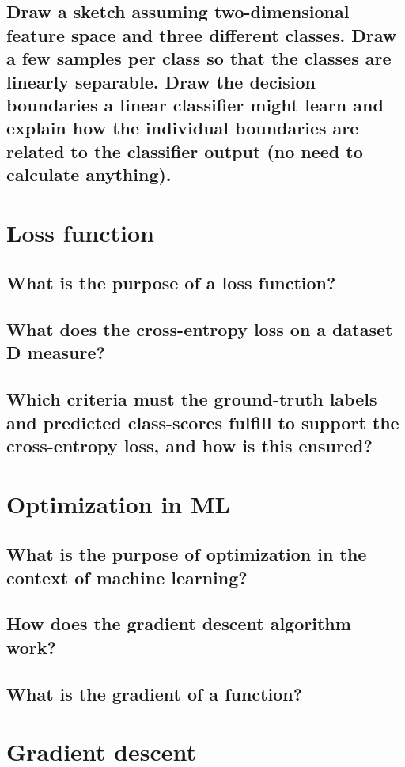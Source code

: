 \subsection{Draw a sketch assuming two-dimensional feature space and three different classes. Draw a few samples per class so that the classes are linearly separable. Draw the decision boundaries a linear classifier might learn and explain how the individual boundaries are related to the classifier output (no need to calculate anything).}

\section{Loss function}
\subsection{What is the purpose of a loss function?}
\subsection{What does the cross-entropy loss on a dataset D measure?}
\subsection{Which criteria must the ground-truth labels and predicted class-scores fulfill to support the cross-entropy loss, and how is this ensured?}

\section{Optimization in ML}
\subsection{What is the purpose of optimization in the context of machine learning?}
\subsection{How does the gradient descent algorithm work?}
\subsection{What is the gradient of a function? }


\section{Gradient descent}
